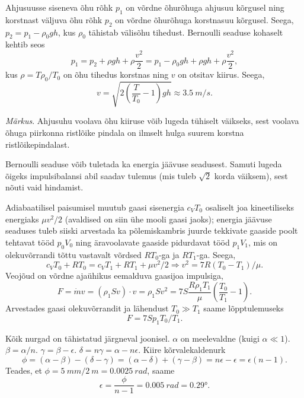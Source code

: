 \documentclass[10pt, twoside]{article}
\begin{document}
{%

\solu
Ahjusuusse siseneva õhu rõhk $p_1$ on võrdne õhurõhuga ahjusuu kõrgusel ning korstnast väljuva õhu rõhk $p_2$ on võrdne õhurõhuga korstnasuu kõrgusel. Seega, $p_2=p_1-\rho_0 gh$, kus $\rho_0$ tähistab välisõhu tihedust. Bernoulli seaduse kohaselt kehtib seos 
\[
p_1=p_2 + \rho gh + \rho \frac{v^2}{2} = p_1 - \rho_0 gh + \rho gh+\rho \frac{v^2}{2},
\]
kus $\rho=T\rho_0/T_0$ on õhu tihedus korstnas ning $v$ on otsitav kiirus. Seega,
\[
v=\sqrt {2\left(\frac T{T_0}-1\right)gh}\approx \SI{3,5}{m/s}.
\]

\emph{Märkus}. Ahjusuhu voolava õhu kiiruse võib lugeda tühiselt väikseks, sest voolava õhuga piirkonna ristlõike pindala on ilmselt hulga suurem korstna ristlõikepindalast.


Bernoulli seaduse võib tuletada ka energia jäävuse seadusest. Samuti lugeda õigeks impulsibalansi abil saadav tulemus (mis tuleb $\sqrt 2$ korda väiksem), sest nõuti vaid hindamist.
\probend
\bigskip


\solu
Adiabaatilisel paisumisel muutub gaasi sisenergia $c_VT_0$ osaliselt joa kineetiliseks energiaks $\mu v^2/2$ (avaldised on siin ühe mooli gaasi jaoks); 
energia jäävuse seaduses tuleb siiski arvestada ka põlemiskambris juurde tekkivate gaaside poolt tehtavat tööd $p_0V_0$ ning
äravoolavate gaaside pidurdavat tööd $p_1V_1$, mis on olekuvõrrandi tõttu
vastavalt võrdsed $RT_0$-ga ja $RT_1$-ga. Seega, 
$$c_VT_0+RT_0=c_VT_1+RT_1+\mu v^2/2 \Rightarrow v^2=7R(T_0-T_1)/\mu.$$
Veojõud on võrdne ajaühikus eemalduva gaasijoa impulsiga,
$$F=\dot m v =(\rho_1 Sv)\cdot v=\rho_1 S v^2 = 7S\frac{R\rho_1T_1}{\mu}\left(\frac{T_0}{T_1}-1\right).$$
Arvestades gaasi olekuvõrrandit ja lähendust $T_0\gg T_1$ saame lõpptulemuseks
$$F=7Sp_1T_0/T_1.$$
\probend
\bigskip


\solu
Kõik nurgad on tähistatud järgneval joonisel. $\alpha$ on meelevaldne (kuigi $\alpha \ll 1$). $\beta = \alpha /n$. $\gamma = \beta - \epsilon$. $\delta = n\gamma = \alpha - n\epsilon$. Kiire kõrvalekaldenurk
\[
\phi=(\alpha-\beta)-(\delta-\gamma)=(\alpha-\delta)+(\gamma-\beta)=n \epsilon-\epsilon=\epsilon(n-1).
\]
Teades, et $\phi = \SI{5}{mm}/\SI{2}{m} = \SI{0.0025}{rad}$, saame
\[
\epsilon=\frac{\phi}{n-1}=\SI{0,005}{rad}=\ang{0,29}.
\]

}
\end{document}
